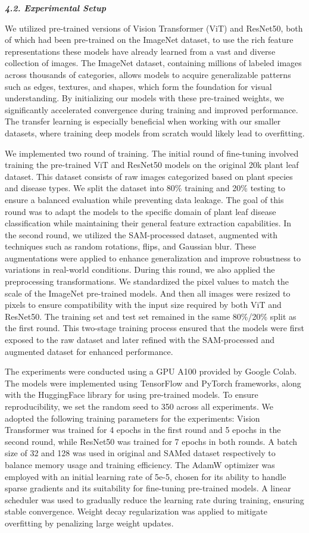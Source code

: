 \documentclass{article}
\begin{document}
\textbf{\textit{4.2. Experimental Setup}}


We utilized pre-trained versions of Vision Transformer (ViT) and ResNet50, both of which had been pre-trained on the ImageNet dataset, to use the rich feature representations these models have already learned from a vast and diverse collection of images. The ImageNet dataset, containing millions of labeled images across thousands of categories, allows models to acquire generalizable patterns such as edges, textures, and shapes, which form the foundation for visual understanding. By initializing our models with these pre-trained weights, we significantly accelerated convergence during training and improved performance. The transfer learning is especially beneficial when working with our smaller datasets, where training deep models from scratch would likely lead to overfitting.

We implemented two round of training. The initial round of fine-tuning involved training the pre-trained ViT and ResNet50 models on the original 20k plant leaf dataset. This dataset consists of raw images categorized based on plant species and disease types. We split the dataset into 80\% training and 20\% testing to ensure a balanced evaluation while preventing data leakage. The goal of this round was to adapt the models to the specific domain of plant leaf disease classification while maintaining their general feature extraction capabilities. In the second round, we utilized the SAM-processed dataset, augmented with techniques such as random rotations, flips, and Gaussian blur. These augmentations were applied to enhance generalization and improve robustness to variations in real-world conditions. During this round, we also applied the preprocessing transformations. We standardized the pixel values to match the scale of the ImageNet pre-trained models. And then all images were resized to pixels to ensure compatibility with the input size required by both ViT and ResNet50. The training set and test set remained in the same 80\%/20\% split as the first round. This two-stage training process ensured that the models were first exposed to the raw dataset and later refined with the SAM-processed and augmented dataset for enhanced performance.

The experiments were conducted using a GPU A100 provided by Google Colab. The models were implemented using TensorFlow and PyTorch frameworks, along with the HuggingFace library for using pre-trained models. To ensure reproducibility, we set the random seed to 350 across all experiments. We adopted the following training parameters for the experiments: Vision Transformer was trained for 4 epochs in the first round and 5 epochs in the second round, while ResNet50 was trained for 7 epochs in both rounds. A batch size of 32 and 128 was used in original and SAMed dataset respectively to balance memory usage and training efficiency. The AdamW optimizer was employed with an initial learning rate of 5e-5, chosen for its ability to handle sparse gradients and its suitability for fine-tuning pre-trained models. A linear scheduler was used to gradually reduce the learning rate during training, ensuring stable convergence. Weight decay regularization was applied to mitigate overfitting by penalizing large weight updates.
\end{document}
